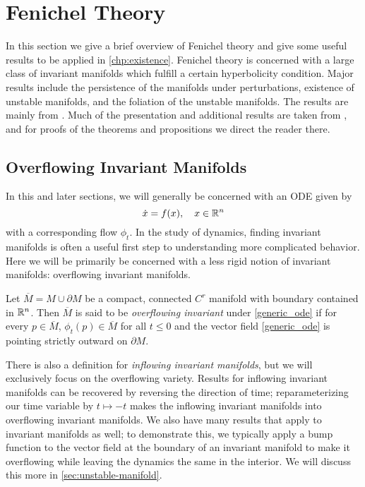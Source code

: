 \chapter{Fenichel Theory}\label{condition-verification}

In this section we give a brief overview of Fenichel theory and give some useful results to be applied in \cref{chp:existence}. Fenichel theory is concerned with a large class of invariant manifolds which fulfill a certain hyperbolicity condition. Major results include the persistence of the manifolds under perturbations, existence of unstable manifolds, and the foliation of the unstable manifolds. The results are mainly from \cite{fenichel1971persistence,fenichel1974asymptotic}. Much of the presentation and additional results are taken from \cite{wiggins1994normally}, and for proofs of the theorems and propositions we direct the reader there.

\section{Overflowing Invariant Manifolds}
In this and later sections, we will generally be concerned with an ODE given by
\begin{equation}\label{generic_ode}
	\dot x = f(x), \quad x \in \mathbb{R}^n
\end{equation}
with a corresponding flow \(\phi_t\). In the study of dynamics, finding invariant manifolds is often a useful first step to understanding more complicated behavior. Here we will be primarily be concerned with a less rigid notion of invariant manifolds: overflowing invariant manifolds.
\begin{defn}
	Let \(\overline M = M \cup \partial M\) be a compact, connected \(C^r\) manifold with boundary contained in \(\mathbb{R}^n\). Then \(\overline M\) is said to be \emph{overflowing invariant} under \cref{generic_ode} if for every \(p \in \overline M\), \(\phi_t(p) \in \overline M\) for all \(t\leq 0\) and the vector field \cref{generic_ode} is pointing strictly outward on \(\partial M\).
\end{defn}
There is also a definition for \emph{inflowing invariant manifolds}, but we will exclusively focus on the overflowing variety. Results for inflowing invariant manifolds can be recovered by reversing the direction of time; reparameterizing our time variable by \(t\mapsto -t\) makes the inflowing invariant manifolds into overflowing invariant manifolds. We also have many results that apply to invariant manifolds as well; to demonstrate this, we typically apply a bump function to the vector field at the boundary of an invariant manifold to make it overflowing while leaving the dynamics the same in the interior. We will discuss this more in \cref{sec:unstable-manifold}.

